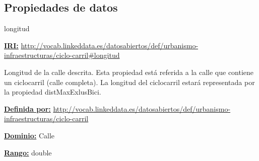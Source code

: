 \subsection{Propiedades de datos}


\begin{mybox}{longitud}
\begin{flushleft}
\underline{\textbf{IRI:}}
\url{http://vocab.linkeddata.es/datosabiertos/def/urbanismo-infraestructuras/ciclo-carril#longitud}
\newline

Longitud de la calle descrita. Esta propiedad está referida a la calle que contiene un ciclocarril (calle completa). La longitud del ciclocarril estará representada por la propiedad distMaxExlusBici.
\newline

\underline{\textbf{Definida por:}}
\url{http://vocab.linkeddata.es/datosabiertos/def/urbanismo-infraestructuras/ciclo-carril}
\newline

\underline{\textbf{Dominio:}}
	Calle
\newline

\underline{\textbf{Rango:}}
		double
\newline

\end{flushleft}
\end{mybox}



